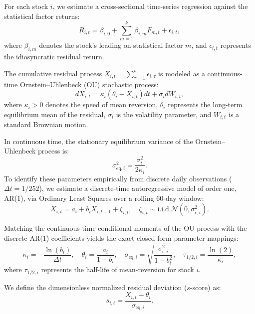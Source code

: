 \documentclass[11pt,a4paper]{article}
\begin{document}
For each stock $i$, we estimate a cross-sectional time-series regression against the statistical factor returns:
\begin{equation}
    R_{i,t} = \beta_{i,0} + \sum_{m=1}^k \beta_{i,m} F_{m,t} + \epsilon_{i,t},
    \label{eq:factor_regression}
\end{equation}
where $\beta_{i,m}$ denotes the stock's loading on statistical factor $m$, and $\epsilon_{i,t}$ represents the idiosyncratic residual return.

The cumulative residual process $X_{i,t} = \sum_{\tau=1}^t \epsilon_{i,\tau}$ is modeled as a continuous-time Ornstein--Uhlenbeck (OU) stochastic process:
\begin{equation}
    dX_{i,t} = \kappa_i (\theta_i - X_{i,t}) dt + \sigma_i dW_{i,t},
    \label{eq:ou_sde}
\end{equation}
where $\kappa_i > 0$ denotes the speed of mean reversion, $\theta_i$ represents the long-term equilibrium mean of the residual, $\sigma_i$ is the volatility parameter, and $W_{i,t}$ is a standard Brownian motion.

In continuous time, the stationary equilibrium variance of the Ornstein--Uhlenbeck process is:
\begin{equation}
    \sigma_{\text{eq},i}^2 = \frac{\sigma_i^2}{2\kappa_i}.
    \label{eq:ou_eq_var}
\end{equation}
To identify these parameters empirically from discrete daily observations ($\Delta t = 1/252$), we estimate a discrete-time autoregressive model of order one, AR(1), via Ordinary Least Squares over a rolling 60-day window:
\begin{equation}
    X_{i,t} = a_i + b_i X_{i,t-1} + \zeta_{i,t}, \quad \zeta_{i,t} \sim \text{i.i.d.} \mathcal{N}(0, \sigma_{\epsilon,i}^2).
    \label{eq:discrete_ar1}
\end{equation}

Matching the continuous-time conditional moments of the OU process with the discrete AR(1) coefficients yields the exact closed-form parameter mappings:
\begin{equation}
    \kappa_i = -\frac{\ln(b_i)}{\Delta t}, \quad \theta_i = \frac{a_i}{1 - b_i}, \quad \sigma_{\text{eq},i} = \sqrt{\frac{\sigma_{\epsilon,i}^2}{1 - b_i^2}}, \quad \tau_{1/2, i} = \frac{\ln(2)}{\kappa_i},
    \label{eq:ou_ar1_params}
\end{equation}
where $\tau_{1/2, i}$ represents the half-life of mean-reversion for stock $i$.

We define the dimensionless normalized residual deviation ($s$-score) as:
\begin{equation}
    s_{i,t} = \frac{X_{i,t} - \theta_i}{\sigma_{\text{eq},i}}.
    \label{eq:s_score}
\end{equation}
\end{document}

